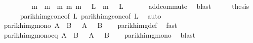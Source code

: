 \begin{isabellebody}
\ \ \ \ \ \ \ \ {\isacharbraceleft}{\kern0pt}\ m{}\ {\isacharplus}{\kern0pt}\ m{}\ {\isacharbar}{\kern0pt}\ m{}\ m{}{\isachardot}{\kern0pt}\ m{}\ {\isasymin}\ {\isasymPsi}\ L{}\ {\isasymand}\ m{}\ {\isasymin}\ {\isasymPsi}\ L{}\ {\isacharbraceright}{\kern0pt}{\isachardoublequoteclose}\isanewline
\ \ \ \ \isamarkupfalse%
\ add{\isachardot}{\kern0pt}commute\ \isamarkupfalse%
\ blast\isanewline
\ \ \isamarkupfalse%
\ \isamarkupfalse%
\ {\isacharquery}{\kern0pt}thesis\isanewline
\ \ \ \ \isamarkupfalse%
\ parikh{\isacharunderscore}{\kern0pt}img{\isacharunderscore}{\kern0pt}conc{\isacharbrackleft}{\kern0pt}of\ L{}{\isacharbrackright}{\kern0pt}\ parikh{\isacharunderscore}{\kern0pt}img{\isacharunderscore}{\kern0pt}conc{\isacharbrackleft}{\kern0pt}of\ L{}{\isacharbrackright}{\kern0pt}\ \isamarkupfalse%
\ auto\isanewline
{}\isamarkupfalse%
%
\endisatagproof
{\isafoldproof}%
%
\isadelimproof
%
\endisadelimproof
%
\isadelimdocument
%
\endisadelimdocument
%
\isatagdocument
%
\isamarkuptrue%
%
\endisatagdocument
{\isafolddocument}%
%
\isadelimdocument
%
\endisadelimdocument
{}\isamarkupfalse%
\ parikh{\isacharunderscore}{\kern0pt}img{\isacharunderscore}{\kern0pt}mono{\isacharcolon}{\kern0pt}\ {\isachardoublequoteopen}A\ {\isasymsubseteq}\ B\ {\isasymLongrightarrow}\ {\isasymPsi}\ A\ {\isasymsubseteq}\ {\isasymPsi}\ B{\isachardoublequoteclose}\isanewline
%
\isadelimproof
\ \ %
\endisadelimproof
%
\isatagproof
{}\isamarkupfalse%
\ parikh{\isacharunderscore}{\kern0pt}img{\isacharunderscore}{\kern0pt}def\ \isamarkupfalse%
\ fast%
\endisatagproof
{\isafoldproof}%
%
\isadelimproof
\isanewline
%
\endisadelimproof
\isanewline
{}\isamarkupfalse%
\ parikh{\isacharunderscore}{\kern0pt}img{\isacharunderscore}{\kern0pt}mono{\isacharunderscore}{\kern0pt}eq{\isacharcolon}{\kern0pt}\ {\isachardoublequoteopen}A\ {\isacharequal}{\kern0pt}\ B\ {\isasymLongrightarrow}\ {\isasymPsi}\ A\ {\isacharequal}{\kern0pt}\ {\isasymPsi}\ B{\isachardoublequoteclose}\isanewline
%
\isadelimproof
\ \ %
\endisadelimproof
%
\isatagproof
{}\isamarkupfalse%
\ parikh{\isacharunderscore}{\kern0pt}img{\isacharunderscore}{\kern0pt}mono\ \isamarkupfalse%
\ blast%
\endisatagproof
{\isafoldproof}%
%

\end{isabellebody}

